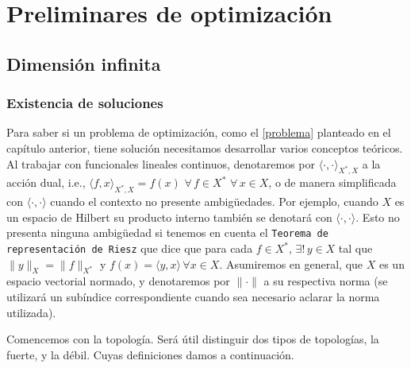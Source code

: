 \documentclass[a4paper,10pt]{book}
\newcommand{\R}{\mathbbm{R}}
\newcommand{\arr}{\rightarrow}
\newcommand{\la}{\langle}
\newcommand{\ra}{\rangle}
\newtheorem{prop}[teo]{Proposici\'on}
\newcounter{ejem}[section]
\begin{document}



\chapter{Preliminares de optimización}
\section{Dimensión infinita}
\subsection{Existencia de soluciones}\label{existenciadesoluciones}

Para saber si un problema de optimización, como el \eqref{problema} planteado en el capítulo anterior, tiene solución necesitamos desarrollar varios conceptos teóricos. Al trabajar con funcionales lineales continuos, denotaremos por $\la\cdot,\cdot\ra_{X^*,X}$ a la acción dual, i.e., $\la f,x\ra_{X^*,X}=f(x)$ $\forall\,f\in X^*$ $\forall\, x\in X$, o de manera simplificada con $\la\cdot,\cdot\ra$ cuando el contexto no presente ambigüedades. Por ejemplo, cuando $X$ es un espacio de Hilbert su producto interno también se denotará con $\la\cdot,\cdot\ra$. Esto no presenta ninguna ambigüedad si tenemos en cuenta el \texttt{Teorema de representación de Riesz} que dice que para cada $f\in X^*,\,\exists!\, y\in X$ tal que $\|y\|_X=\|f\|_{X^*}$ y $f(x)=\la y,x\ra\,\forall x\in X$. Asumiremos en general, que $X$ es un espacio vectorial normado, y denotaremos por $\|\cdot\|$ a su respectiva norma (se utilizará un subíndice correspondiente cuando sea necesario aclarar la norma utilizada).


Comencemos con la topología. Será útil distinguir dos tipos de topologías, la fuerte, y la débil. Cuyas definiciones damos a continuación.
\end{document}
